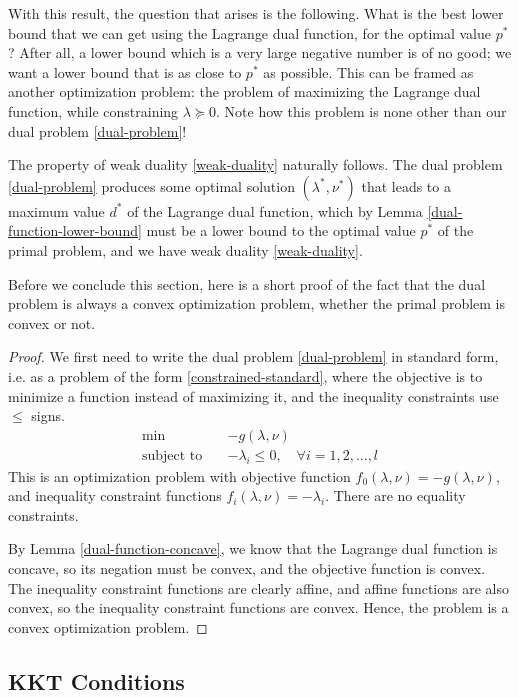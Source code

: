 \documentclass[a4paper]{article}
\theoremstyle{definition}
\begin{document}
With this result, the question that arises is the following.
What is the best lower bound that we can get using the Lagrange dual function, for the optimal value $p^*$?
After all, a lower bound which is a very large negative number is of no good; we want a lower bound that is as close to $p^*$ as possible.
This can be framed as another optimization problem: the problem of maximizing the Lagrange dual function, while constraining $\lambda \succeq 0$.
Note how this problem is none other than our dual problem \eqref{dual-problem}!

The property of weak duality \eqref{weak-duality} naturally follows.
The dual problem \eqref{dual-problem} produces some optimal solution $(\lambda^*, \nu^*)$ that leads to a maximum value $d^*$ of the Lagrange dual function, which by Lemma \ref{dual-function-lower-bound} must be a lower bound to the optimal value $p^*$ of the primal problem, and we have weak duality \eqref{weak-duality}.

Before we conclude this section, here is a short proof of the fact that the dual problem is always a convex optimization problem, whether the primal problem is convex or not.
\begin{proof}
	We first need to write the dual problem \eqref{dual-problem} in standard form, i.e. as a problem of the form \eqref{constrained-standard}, where the objective is to minimize a function instead of maximizing it, and the inequality constraints use $\leq$ signs.
	\begin{align*}
		\min \quad & -g(\lambda, \nu) \\
		\text{subject to} \quad & -\lambda_i \leq 0, \quad \forall i = 1, 2, \dots, l
	\end{align*}
	This is an optimization problem with objective function $f_0(\lambda, \nu) = -g(\lambda, \nu)$, and inequality constraint functions $f_i(\lambda, \nu) = -\lambda_i$.
	There are no equality constraints.

	By Lemma \ref{dual-function-concave}, we know that the Lagrange dual function is concave, so its negation must be convex, and the objective function is convex.
	The inequality constraint functions are clearly affine, and affine functions are also convex, so the inequality constraint functions are convex.
	Hence, the problem is a convex optimization problem.
\end{proof}

\subsection{KKT Conditions}
\label{kkt-derivation}
\end{document}
